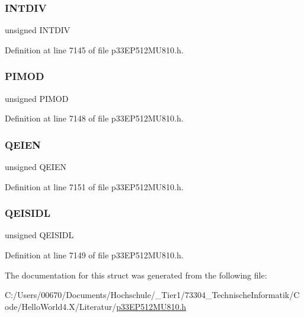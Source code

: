\subsubsection{\texorpdfstring{I\+N\+T\+D\+IV}{INTDIV}}
{\footnotesize\ttfamily unsigned I\+N\+T\+D\+IV}



Definition at line 7145 of file p33\+E\+P512\+M\+U810.\+h.

\mbox{\label{structtag_q_e_i2_c_o_n_b_i_t_s_adcfde04c51defc9d36ec58e4c15cc28e}} 
\subsubsection{\texorpdfstring{P\+I\+M\+OD}{PIMOD}}
{\footnotesize\ttfamily unsigned P\+I\+M\+OD}



Definition at line 7148 of file p33\+E\+P512\+M\+U810.\+h.

\mbox{\label{structtag_q_e_i2_c_o_n_b_i_t_s_ad84b7ff5d720a8a5a8c3c04b9ffc346b}} 
\subsubsection{\texorpdfstring{Q\+E\+I\+EN}{QEIEN}}
{\footnotesize\ttfamily unsigned Q\+E\+I\+EN}



Definition at line 7151 of file p33\+E\+P512\+M\+U810.\+h.

\mbox{\label{structtag_q_e_i2_c_o_n_b_i_t_s_adf814839ec245aa961a874d878c37329}} 
\subsubsection{\texorpdfstring{Q\+E\+I\+S\+I\+DL}{QEISIDL}}
{\footnotesize\ttfamily unsigned Q\+E\+I\+S\+I\+DL}



Definition at line 7149 of file p33\+E\+P512\+M\+U810.\+h.



The documentation for this struct was generated from the following file\+:\begin{DoxyCompactItemize}
\item 
C\+:/\+Users/00670/\+Documents/\+Hochschule/\+\_\+\+Tier1/73304\+\_\+\+Technische\+Informatik/\+Code/\+Hello\+World4.\+X/\+Literatur/\hyperlink{p33_e_p512_m_u810_8h}{p33\+E\+P512\+M\+U810.\+h}\end{DoxyCompactItemize}

